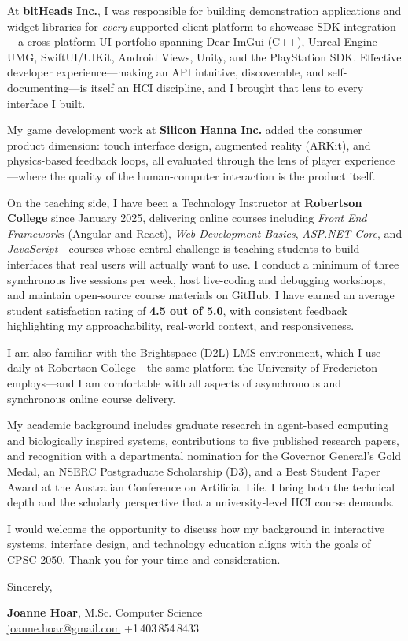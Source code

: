 \documentclass[11pt]{article}
\begin{document}
At \textbf{bitHeads Inc.}, I was responsible for building demonstration applications and widget libraries for \textit{every} supported client platform to showcase SDK integration---a cross-platform UI portfolio spanning Dear ImGui (C++), Unreal Engine UMG, SwiftUI/UIKit, Android Views, Unity, and the PlayStation SDK. Effective developer experience---making an API intuitive, discoverable, and self-documenting---is itself an HCI discipline, and I brought that lens to every interface I built.

My game development work at \textbf{Silicon Hanna Inc.} added the consumer product dimension: touch interface design, augmented reality (ARKit), and physics-based feedback loops, all evaluated through the lens of player experience---where the quality of the human-computer interaction is the product itself.

On the teaching side, I have been a Technology Instructor at \textbf{Robertson College} since January 2025, delivering online courses including \textit{Front End Frameworks} (Angular and React), \textit{Web Development Basics}, \textit{ASP.NET Core}, and \textit{JavaScript}---courses whose central challenge is teaching students to build interfaces that real users will actually want to use. I conduct a minimum of three synchronous live sessions per week, host live-coding and debugging workshops, and maintain open-source course materials on GitHub. I have earned an average student satisfaction rating of \textbf{4.5 out of 5.0}, with consistent feedback highlighting my approachability, real-world context, and responsiveness.

I am also familiar with the Brightspace (D2L) LMS environment, which I use daily at Robertson College---the same platform the University of Fredericton employs---and I am comfortable with all aspects of asynchronous and synchronous online course delivery.

My academic background includes graduate research in agent-based computing and biologically inspired systems, contributions to five published research papers, and recognition with a departmental nomination for the Governor General's Gold Medal, an NSERC Postgraduate Scholarship (D3), and a Best Student Paper Award at the Australian Conference on Artificial Life. I bring both the technical depth and the scholarly perspective that a university-level HCI course demands.

I would welcome the opportunity to discuss how my background in interactive systems, interface design, and technology education aligns with the goals of CPSC 2050. Thank you for your time and consideration.

\vspace{16pt}
Sincerely,

\vspace{24pt}
\textbf{Joanne Hoar}, M.Sc. Computer Science \\
\href{mailto:joanne.hoar@gmail.com}{joanne.hoar@gmail.com} \quad +1\,403\,854\,8433
\end{document}
